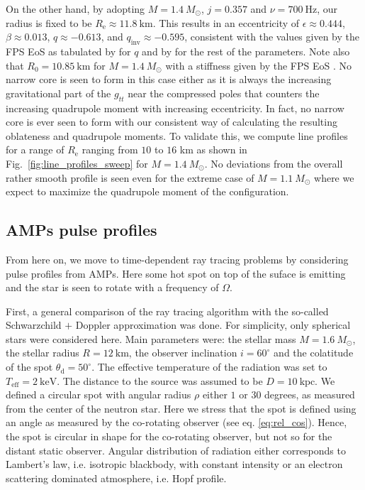 \documentclass[iop, usenatbib]{emulateapj}
\newcommand{\Msun}{\ensuremath{M_{\odot}}}
\newcommand{\qinv}{\ensuremath{q_{\mathrm{inv}}}}
\begin{document}
On the other hand, by adopting $M = 1.4~\Msun$, $j = 0.357$ and $\nu = 700~\mathrm{Hz}$, our radius is fixed to be $R_{\mathrm{e}} \approx 11.8~\mathrm{km}$.
This results in an eccentricity of $\epsilon \approx 0.444$, $\beta \approx 0.013$, $q \approx -0.613$, and $\qinv \approx -0.595$, consistent with the values given by the FPS EoS as tabulated by \citealt{LP99} for $q$ and by \citealt{CST94} for the rest of the parameters.
Note also that $R_0 = 10.85~\mathrm{km}$ for $M=1.4~\Msun$ with a stiffness given by the FPS EoS \citep{CST94}.
No narrow core is seen to form in this case either as it is always the increasing gravitational part of the $g_{tt}$ near the compressed poles that counters the increasing quadrupole moment with increasing eccentricity.
In fact, no narrow core is ever seen to form with our consistent way of calculating the resulting oblateness and quadrupole moments.
To validate this, we compute line profiles for a range of $R_{\mathrm{e}}$ ranging from $10$ to $16$ km as shown in Fig.~\ref{fig:line_profiles_sweep} for $M=1.4~\Msun$.
No deviations from the overall rather smooth profile is seen even for the extreme case of $M = 1.1~\Msun$ where we expect to maximize the quadrupole moment of the configuration.



\subsection{AMPs pulse profiles}

From here on, we move to time-dependent ray tracing problems by considering pulse profiles from AMPs.
Here some hot spot on top of the suface is emitting and the star is seen to rotate with a frequency of $\Omega$.



First, a general comparison of the ray tracing algorithm with the so-called Schwarzchild $+$ Doppler approximation \citep[see e.g.][]{PB06} was done.  
For simplicity, only spherical stars were considered here.
Main parameters were: the stellar mass $M = 1.6~\Msun$, the stellar radius $R = 12~\mathrm{km}$, the observer inclination $i = 60^{\circ}$ and the colatitude of the spot $\theta_{\mathrm{d}} = 50^{\circ}$.  
The effective temperature of the radiation was set to $T_{\mathrm{eff}} = 2~\mathrm{keV}$.  
The distance to the source was assumed to be $D = 10~\mathrm{kpc}$.  
We defined a circular spot with angular radius $\rho$ either $1$ or $30$ degrees, as measured from the center of the neutron star.  
Here we stress that the spot is defined using an angle as measured by the co-rotating observer (see eq.  \eqref{eq:rel_cos}).
Hence, the spot is circular in shape for the co-rotating observer, but not so for the distant static observer.
Angular distribution of radiation either corresponds to Lambert's law, i.e. isotropic blackbody, with constant intensity or an electron scattering dominated atmosphere, i.e. Hopf profile.
\end{document}
